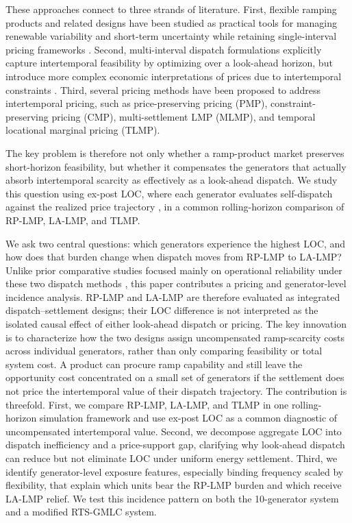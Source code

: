 \documentclass[conference]{IEEEtran}
\begin{document}
These approaches connect to three strands of literature. First, flexible ramping products and related designs have been studied as practical tools for managing renewable variability and short-term uncertainty while retaining single-interval pricing frameworks \cite{ela2016,Wang2017_review,CWang2017,wu2016,Chen2017,Chen2023}. Second, multi-interval dispatch formulations explicitly capture intertemporal feasibility by optimizing over a look-ahead horizon, but introduce more complex economic interpretations of prices due to intertemporal constraints \cite{Hua2019,Zhao2020,Scott2019,mickey2015mirtm}. Third, several pricing methods have been proposed to address intertemporal pricing, such as price-preserving pricing (PMP), constraint-preserving pricing (CMP), multi-settlement LMP (MLMP), and temporal locational marginal pricing (TLMP)\cite{hogan2020,Hua2019,Zhao2020,Guo2021}.

The key problem is therefore not only whether a ramp-product market preserves short-horizon feasibility, but whether it compensates the generators that actually absorb intertemporal scarcity as effectively as a look-ahead dispatch. We study this question using ex-post LOC, where each generator evaluates self-dispatch against the realized price trajectory \cite{Cho2023}, in a common rolling-horizon comparison of RP-LMP, LA-LMP, and TLMP.

We ask two central questions: which generators experience the highest LOC, and how does that burden change when dispatch moves from RP-LMP to LA-LMP? Unlike prior comparative studies focused mainly on operational reliability under these two dispatch methods \cite{Zhang2026_PSCC}, this paper contributes a pricing and generator-level incidence analysis. RP-LMP and LA-LMP are therefore evaluated as integrated dispatch--settlement designs; their LOC difference is not interpreted as the isolated causal effect of either look-ahead dispatch or pricing. The key innovation is to characterize how the two designs assign uncompensated ramp-scarcity costs across individual generators, rather than only comparing feasibility or total system cost. A product can procure ramp capability and still leave the opportunity cost concentrated on a small set of generators if the settlement does not price the intertemporal value of their dispatch trajectory. The contribution is threefold. First, we compare RP-LMP, LA-LMP, and TLMP in one rolling-horizon simulation framework and use ex-post LOC as a common diagnostic of uncompensated intertemporal value. Second, we decompose aggregate LOC into dispatch inefficiency and a price-support gap, clarifying why look-ahead dispatch can reduce but not eliminate LOC under uniform energy settlement. Third, we identify generator-level exposure features, especially binding frequency scaled by flexibility, that explain which units bear the RP-LMP burden and which receive LA-LMP relief. We test this incidence pattern on both the 10-generator system and a modified RTS-GMLC system.
\end{document}
